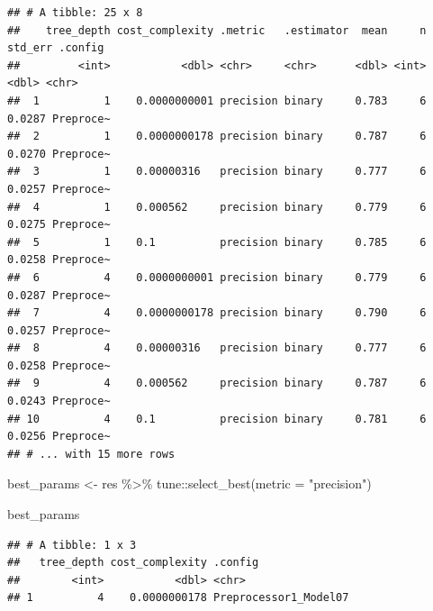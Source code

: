 \documentclass[
]{article}
\newenvironment{Shaded}{\begin{snugshade}}{\end{snugshade}}
\newcommand{\AttributeTok}[1]{\textcolor[rgb]{0.77,0.63,0.00}{#1}}
\newcommand{\FunctionTok}[1]{\textcolor[rgb]{0.00,0.00,0.00}{#1}}
\newcommand{\NormalTok}[1]{#1}
\newcommand{\OtherTok}[1]{\textcolor[rgb]{0.56,0.35,0.01}{#1}}
\newcommand{\SpecialCharTok}[1]{\textcolor[rgb]{0.00,0.00,0.00}{#1}}
\newcommand{\StringTok}[1]{\textcolor[rgb]{0.31,0.60,0.02}{#1}}
\begin{document}
\begin{verbatim}
## # A tibble: 25 x 8
##    tree_depth cost_complexity .metric   .estimator  mean     n std_err .config  
##         <int>           <dbl> <chr>     <chr>      <dbl> <int>   <dbl> <chr>    
##  1          1    0.0000000001 precision binary     0.783     6  0.0287 Preproce~
##  2          1    0.0000000178 precision binary     0.787     6  0.0270 Preproce~
##  3          1    0.00000316   precision binary     0.777     6  0.0257 Preproce~
##  4          1    0.000562     precision binary     0.779     6  0.0275 Preproce~
##  5          1    0.1          precision binary     0.785     6  0.0258 Preproce~
##  6          4    0.0000000001 precision binary     0.779     6  0.0287 Preproce~
##  7          4    0.0000000178 precision binary     0.790     6  0.0257 Preproce~
##  8          4    0.00000316   precision binary     0.777     6  0.0258 Preproce~
##  9          4    0.000562     precision binary     0.787     6  0.0243 Preproce~
## 10          4    0.1          precision binary     0.781     6  0.0256 Preproce~
## # ... with 15 more rows
\end{verbatim}

\begin{Shaded}
\begin{Highlighting}[]
\NormalTok{best\_params }\OtherTok{\textless{}{-}}
\NormalTok{  res }\SpecialCharTok{\%\textgreater{}\%}
\NormalTok{  tune}\SpecialCharTok{::}\FunctionTok{select\_best}\NormalTok{(}\AttributeTok{metric =} \StringTok{"precision"}\NormalTok{)}

\NormalTok{best\_params}
\end{Highlighting}
\end{Shaded}

\begin{verbatim}
## # A tibble: 1 x 3
##   tree_depth cost_complexity .config              
##        <int>           <dbl> <chr>                
## 1          4    0.0000000178 Preprocessor1_Model07
\end{verbatim}
\end{document}
